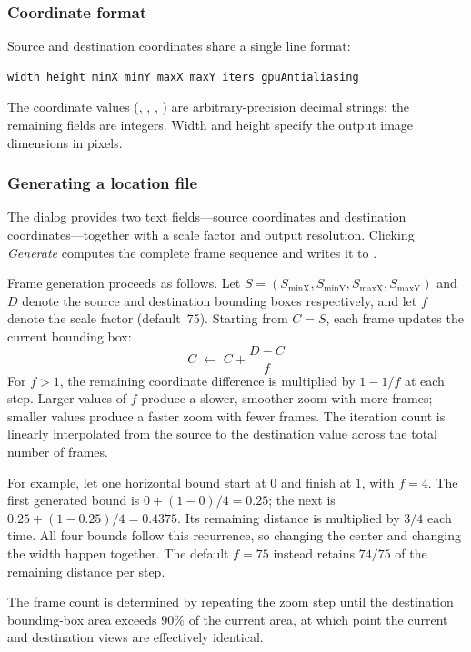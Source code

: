 \subsubsection*{Coordinate format}

Source and destination coordinates share a single line format:

\begin{lstlisting}
width height minX minY maxX maxY iters gpuAntialiasing
\end{lstlisting}

\noindent
The coordinate values (, , ,
) are arbitrary-precision decimal strings; the remaining
fields are integers.  Width and height specify the output image
dimensions in pixels.

\subsubsection*{Generating a location file}

The dialog provides two text fields---source coordinates and
destination coordinates---together with a scale factor and output
resolution.  Clicking \emph{Generate} computes the complete frame
sequence and writes it to .

Frame generation proceeds as follows.  Let $S = (S_\mathrm{minX},
S_\mathrm{minY}, S_\mathrm{maxX}, S_\mathrm{maxY})$ and $D$
denote the source and destination bounding boxes respectively, and
let $f$ denote the scale factor (default~75).  Starting from $C = S$,
each frame updates the current bounding box:
\[
  C \;\leftarrow\; C + \frac{D - C}{f}
\]
For $f>1$, the remaining coordinate difference is multiplied by $1-1/f$
at each step. Larger values of $f$
produce a slower, smoother zoom with more frames; smaller values
produce a faster zoom with fewer frames.  The iteration count is
linearly interpolated from the source to the destination value
across the total number of frames.

For example, let one horizontal bound start at $0$ and finish at $1$, with
$f=4$. The first generated bound is $0+(1-0)/4=0.25$; the next is
$0.25+(1-0.25)/4=0.4375$. Its remaining distance is multiplied by $3/4$
each time. All four bounds follow this recurrence, so changing the center and
changing the width happen together. The default $f=75$ instead retains
$74/75$ of the remaining distance per step.

The frame count is determined by repeating the zoom step until the
destination bounding-box area exceeds $90\%$ of the current area,
at which point the current and destination views are effectively
identical.

